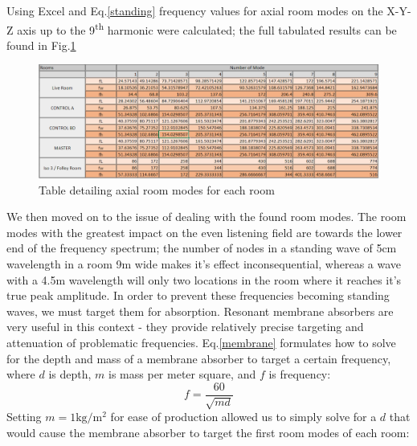 \documentclass[10pt, twocolumn]{article}
\begin{document}
        Using Excel and Eq.\ref{standing} frequency values for axial room modes on the X-Y-Z axis up to the 9\textsuperscript{th} harmonic were calculated; the full tabulated results can be found in Fig.\ref{modes}
        \begin{figure}[ht]
            \centering
            \includegraphics[scale=0.6]{resources/modes.png}
            \caption{Table detailing axial room modes for each room}
            \label{modes}
        \end{figure}
        We then moved on to the issue of dealing with the found room modes.
        The room modes with the greatest impact on the even listening field are towards the lower end of the frequency spectrum; the number of nodes in a standing wave of 5cm wavelength in a room 9m wide makes it's effect inconsequential, whereas a wave with a 4.5m wavelength will only two locations in the room where it reaches it's true peak amplitude.
        In order to prevent these frequencies becoming standing waves, we must target them for absorption.
        Resonant membrane absorbers are very useful in this context - they provide relatively precise targeting and attenuation of problematic frequencies.
        Eq.\ref{membrane} formulates how to solve for the depth and mass of a membrane absorber to target a certain frequency, where $d$ is depth, $m$ is mass per meter square, and $f$ is frequency:
        \begin{equation}\label{membrane}
            f = \frac{60}{\sqrt{md}}
        \end{equation}
        Setting $m=1\si{\kilogram\per\meter\squared}$ for ease of production allowed us to simply solve for a $d$ that would cause the membrane absorber to target the first room modes of each room:
\end{document}
